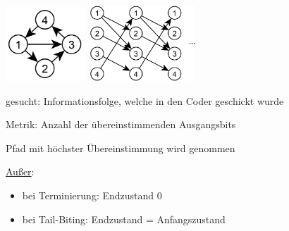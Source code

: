 \includegraphics[width=3cm]{img/zustandsgraph.PNG}
\;\;\;\;
\includegraphics[width=4cm]{img/trellis.PNG}

gesucht: Informationsfolge, welche in den Coder geschickt wurde

Metrik: Anzahl der übereinstimmenden Ausgangsbits

Pfad mit höchster Übereinstimmung wird genommen

\underline{Außer}:
\begin{itemize}
    \item bei Terminierung: Endzustand 0
    \item bei Tail-Biting: Endzustand = Anfangszustand
\end{itemize}

